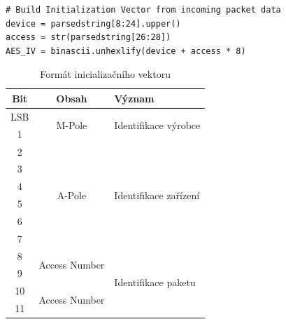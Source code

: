 \begin{lstlisting}[caption={Sestavení inicializačního vektoru},captionpos=b,label=CodeIV,style=MyCodePython]
# Build Initialization Vector from incoming packet data
device = parsedstring[8:24].upper()
access = str(parsedstring[26:28])
AES_IV = binascii.unhexlify(device + access * 8)
\end{lstlisting}

\begin{table}[!ht]
  \caption{Formát inicializačního vektoru}
	\label{TabulkaInicializacniVektor}
	\vspace{-10pt}
	\begin{center}
\begin{tabular}{|c|c|l|}
\hline
\textbf{Bit} & \textbf{Obsah}                 & \textbf{Význam}                        \\ \hline \hline
LSB          & \multirow{2}{*}{M-Pole}        & \multirow{2}{*}{Identifikace výrobce}  \\ \cline{1-1}
1            &                                &                                        \\ \hline
2            & \multirow{6}{*}{A-Pole}        & \multirow{6}{*}{Identifikace zařízení} \\ \cline{1-1}
3            &                                &                                        \\ \cline{1-1}
4            &                                &                                        \\ \cline{1-1}
5            &                                &                                        \\ \cline{1-1}
6            &                                &                                        \\ \cline{1-1}
7            &                                &                                        \\ \hline
8            & \multirow{2}{*}{Access Number} & \multirow{8}{*}{Identifikace paketu}   \\ \cline{1-1}
9            &                                &                                        \\ \cline{1-2}
10           & \multirow{2}{*}{Access Number} &                                        \\ \cline{1-1}
11           &                                &                                        \\ \cline{1-2}

\end{tabular}
\end{center}
\end{table}
